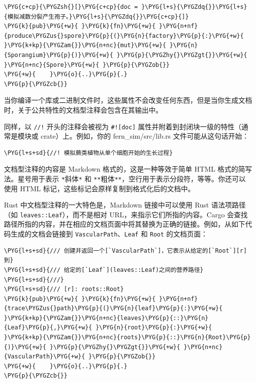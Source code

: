 \begin{Verbatim}[commandchars=\\\{\},breaklines=true,breakanywhere=true,fontsize=\codefont,xleftmargin=17bp]
\PYG{c+cp}{\PYGZsh{}[}\PYG{c+cp}{doc = }\PYG{l+s}{\PYGZdq{}}\PYG{l+s}{模拟减数分裂产生孢子。}\PYG{l+s}{\PYGZdq{}}\PYG{c+cp}{]}
\PYG{k}{pub}\PYG{+w}{ }\PYG{k}{fn}\PYG{+w}{ }\PYG{n+nf}{produce\PYGZus{}spore}\PYG{p}{(}\PYG{n}{factory}\PYG{p}{:}\PYG{+w}{ }\PYG{k+kp}{\PYGZam{}}\PYG{n+nc}{mut}\PYG{+w}{ }\PYG{n}{Sporangium}\PYG{p}{)}\PYG{+w}{ }\PYG{p}{\PYGZhy{}\PYGZgt{}}\PYG{+w}{ }\PYG{n+nc}{Spore}\PYG{+w}{ }\PYG{p}{\PYGZob{}}
\PYG{+w}{    }\PYG{o}{..}\PYG{p}{.}
\PYG{p}{\PYGZcb{}}
\end{Verbatim}

当你编译一个库或二进制文件时，这些属性不会改变任何东西，但是当你生成文档时，关于公共特性的文档型注释会包含在其输出中。

同样，以 \texttt{//!} 开头的注释会被视为 \texttt{\#![doc]} 属性并附着到封闭块一级的特性（通常是模块或 crate）上。例如，你的 fern\_sim/\allowbreak{}src/\allowbreak{}lib.rs 文件可能从这句话开始：

\begin{Verbatim}[commandchars=\\\{\},breaklines=true,breakanywhere=true,fontsize=\codefont,xleftmargin=17bp]
\PYG{l+s+sd}{//! 模拟蕨类植物从单个细胞开始的生长过程}
\end{Verbatim}

文档型注释的内容是 Markdown 格式的，这是一种等效于简单 HTML 格式的简写法。星号用于表示 \texttt{*}斜体\texttt{*} 和 \texttt{**}粗体\texttt{**}，空行用于表示分段符，等等。你还可以使用 HTML 标记，这些标记会原样复制到格式化后的文档中。

Rust 中文档型注释的一大特色是，Markdown 链接中可以使用 Rust 语法项路径（如 \texttt{leaves::Leaf}），而不是相对 URL，来指示它们所指的内容。Cargo 会查找路径所指的内容，并在相应的文档页面中将其替换为正确的链接。例如，从如下代码生成的文档会链接到 \texttt{VascularPath}、\texttt{Leaf} 和 \texttt{Root} 的文档页面：

\begin{Verbatim}[commandchars=\\\{\},breaklines=true,breakanywhere=true,fontsize=\codefont,xleftmargin=17bp]
\PYG{l+s+sd}{/// 创建并返回一个[`VascularPath`]，它表示从给定的[`Root`][r]到}
\PYG{l+s+sd}{/// 给定的[`Leaf`](leaves::Leaf)之间的营养路径}
\PYG{l+s+sd}{///}
\PYG{l+s+sd}{/// [r]: roots::Root}
\PYG{k}{pub}\PYG{+w}{ }\PYG{k}{fn}\PYG{+w}{ }\PYG{n+nf}{trace\PYGZus{}path}\PYG{p}{(}\PYG{n}{leaf}\PYG{p}{:}\PYG{+w}{ }\PYG{k+kp}{\PYGZam{}}\PYG{n+nc}{leaves}\PYG{p}{::}\PYG{n}{Leaf}\PYG{p}{,}\PYG{+w}{ }\PYG{n}{root}\PYG{p}{:}\PYG{+w}{ }\PYG{k+kp}{\PYGZam{}}\PYG{n+nc}{roots}\PYG{p}{::}\PYG{n}{Root}\PYG{p}{)}\PYG{+w}{ }\PYG{p}{\PYGZhy{}\PYGZgt{}}\PYG{+w}{ }\PYG{n+nc}{VascularPath}\PYG{+w}{ }\PYG{p}{\PYGZob{}}
\PYG{+w}{    }\PYG{o}{..}\PYG{p}{.}
\PYG{p}{\PYGZcb{}}
\end{Verbatim}

